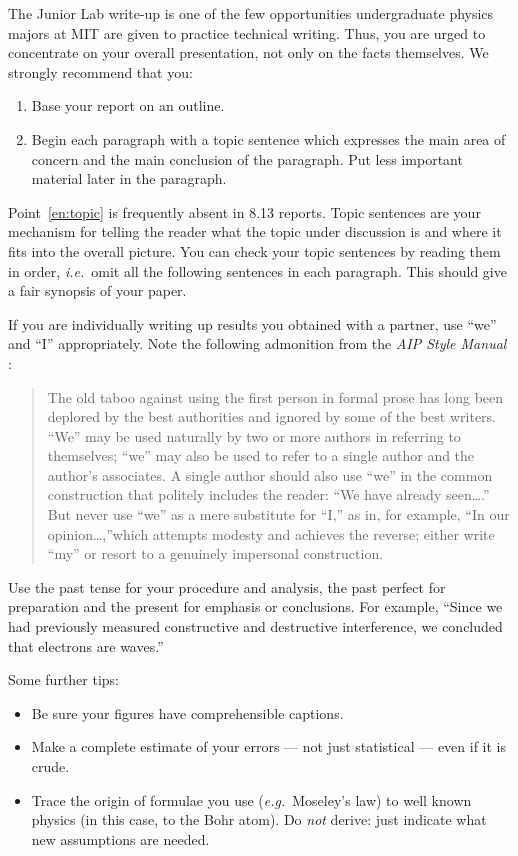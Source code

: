 The Junior Lab write-up is one of the few opportunities
undergraduate physics majors at MIT are given to practice 
technical writing. Thus, you are urged to concentrate on your 
overall presentation, not only on the
facts themselves. We strongly recommend that you:
\begin{enumerate}
\item Base your report on an outline.
\item \label{en:topic} Begin each paragraph with a topic sentence 
which expresses the main area of concern and the main conclusion 
of the paragraph. Put less important material later in the 
paragraph.
\end{enumerate}
Point~\ref{en:topic} is frequently absent in 8.13 reports. Topic 
sentences are your mechanism for telling the reader what the 
topic under discussion is and where it fits into the overall 
picture.
You can check your topic sentences by reading them in order, 
\textit{i.e.}\ omit all the following sentences in each 
paragraph.  This should give a fair synopsis of your paper.

If you are individually writing up results you obtained with a
partner, use ``we'' and ``I'' appropriately. Note the following admonition
from the \textit{AIP Style Manual} \cite[Section III.A.9]{aip1990}:
\begin{quote}
The old taboo against using the first person in formal prose has long been deplored by the best authorities and ignored by some of the best writers. ``We'' may be used naturally by two or more authors in referring to themselves; ``we'' may also be used to refer to a single author and the author's associates. A single author should also use ``we'' in the common construction that politely includes the reader: ``We have already seen\ldots .'' But never use ``we'' as a mere substitute for ``I,'' as in, for example, ``In our opinion\ldots,''which attempts modesty and achieves the reverse; either write ``my'' or resort to a genuinely impersonal construction.
\end{quote}

Use the past tense for your procedure and analysis, the past 
perfect for preparation and the present for emphasis or 
conclusions. For example, 
``Since we had previously measured constructive and destructive
interference, we concluded that electrons are waves.''

Some further tips:
\begin{itemize}
\item Be sure your figures have comprehensible captions.
\item Make a complete estimate of your errors  --- not just 
statistical --- even if it is crude.
\item Trace the origin of formulae you use 
(\textit{e.g.}\ Moseley's law) to well known physics (in this 
case, to the Bohr atom).  Do \emph{not} derive: just indicate what new 
assumptions are needed.
\end{itemize}

